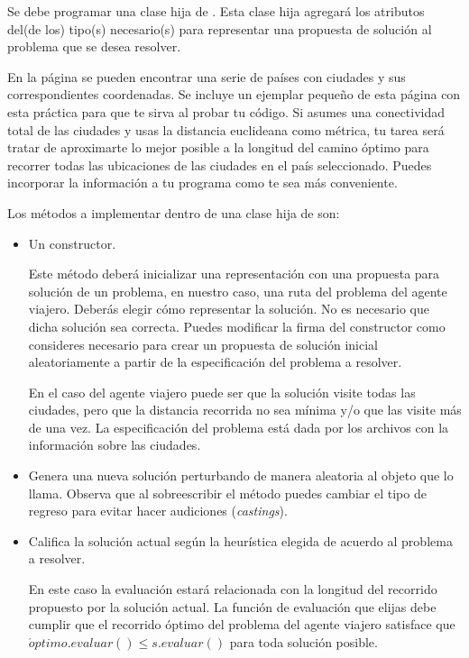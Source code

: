 Se debe programar una clase hija de .  Esta clase hija agregará los atributos del(de los) tipo(s) necesario(s) para representar una propuesta de solución al problema que se desea resolver.

En la página  se pueden encontrar una serie de países con ciudades y sus correspondientes coordenadas.  Se incluye un ejemplar pequeño de esta página con esta práctica para que te sirva al probar tu código.  Si asumes una conectividad total de las ciudades y usas la distancia euclideana como métrica, tu tarea será tratar de aproximarte lo mejor posible a la longitud del camino óptimo para recorrer todas las ubicaciones de las ciudades en el país seleccionado.  Puedes incorporar la información a tu programa como te sea más conveniente.

Los métodos a implementar dentro de una clase hija de  son:
\begin{itemize}
 \item Un constructor.
 
 Este método deberá inicializar una representación con una propuesta para solución de un problema, en nuestro caso, una ruta del problema del agente viajero.  Deberás elegir cómo representar la solución.  No es necesario que dicha solución sea correcta.  Puedes modificar la firma del constructor como consideres necesario para crear un propuesta de solución inicial aleatoriamente a partir de la especificación del problema a resolver.
 
 En el caso del agente viajero puede ser que la solución visite todas las ciudades, pero que la distancia recorrida no sea mínima y/o que las visite más de una vez.  La especificación del problema está dada por los archivos  con la información sobre las ciudades.
 
 \item {}
 
 Genera una nueva solución perturbando de manera aleatoria al objeto que lo llama.  Observa que al sobreescribir el método puedes cambiar el tipo de regreso para evitar hacer audiciones (\textit{castings}).
 
 \item {}
 
 Califica la solución actual según la heurística elegida de acuerdo al problema a resolver.
 
 En este caso la evaluación estará relacionada con la longitud del recorrido propuesto por la solución actual.  La función de evaluación que elijas debe cumplir que el recorrido óptimo del problema del agente viajero satisface que $\acute{o}ptimo.evaluar() \leq s.evaluar()$ para toda solución posible.
\end{itemize}


